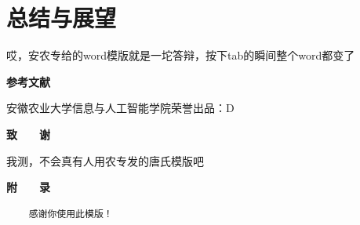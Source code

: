 \documentclass[UTF8,a4paper,12pt]{ctexart}
\begin{document}
	\section{\fontsize{16pt}{\baselineskip}\heiti 总结与展望}
	哎，安农专给的word模版就是一坨答辩，按下tab的瞬间整个word都变了
	
	
	
	\newpage
	 
	\centerline{\textbf{\fontsize{16pt}{\baselineskip}\heiti 参考文献}}
	\vspace{-0.5cm} 
	\renewcommand{\refname}{\leftline{Reference}}
	\begin{thebibliography}{}
		\vspace{-1cm} 
		安徽农业大学信息与人工智能学院荣誉出品：D
		
	\end{thebibliography}
	
	\newpage
	 
	\centerline{\textbf{\fontsize{16pt}{\baselineskip}\heiti 致　　谢}}
	\vspace{0.4cm}
	我测，不会真有人用农专发的唐氏模版吧
	\newpage
	\pagestyle{empty}
	 
	\centerline{\textbf{\fontsize{16pt}{\baselineskip}\heiti 附　　录}}
	\begin{spacing}{1.1}
	\begin{verbatim}
	感谢你使用此模版！
		
	\end{verbatim}
	\end{spacing}
	
	
\end{document}
